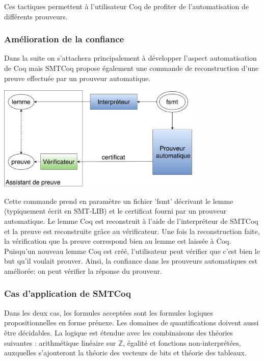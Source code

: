 \documentclass[11pt]{article}
\begin{document}
Ces tactiques permettent à l'utilisateur Coq de profiter de l'automatisation de différents prouveurs.\\



\subsubsection{Amélioration de la confiance}

Dans la suite on s'attachera principalement à développer l'aspect automatisation de Coq mais SMTCoq propose également une commande de reconstruction d'une preuve effectuée par un prouveur automatique.

\begin{center}
\includegraphics[height=5cm]{Confiance.pdf}
\end{center}

Cette commande prend en paramètre un fichier 'fsmt' décrivant le lemme (typiquement écrit en SMT-LIB) et le certificat fourni par un prouveur automatique. Le lemme Coq est reconstruit à l'aide de l'interpréteur de SMTCoq et la preuve est reconstruite grâce au vérificateur. Une fois la reconstruction faite, la vérification que la preuve correspond bien au lemme est laissée à Coq. \\

Puisqu'un nouveau lemme Coq est créé, l'utilisateur peut vérifier que c'est bien le but qu'il voulait prouver. Ainsi, la confiance dans les prouveurs automatiques est améliorée: on peut vérifier la réponse du prouveur.


\subsubsection{Cas d'application de SMTCoq}

Dans les deux cas, les formules acceptées sont les formules logiques propositionnelles en forme prénexe. Les domaines de quantifications doivent aussi être décidables. La logique est étendue avec les combinaisons des théories suivantes : arithmétique linéaire sur $\mathbb{Z}$, égalité et fonctions non-interprétées, auxquelles s'ajouteront la théorie des vecteurs de bits et théorie des tableaux. 
\end{document}
